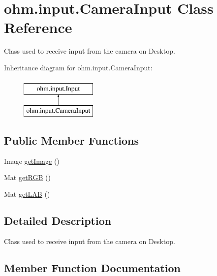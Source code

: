 \hypertarget{classohm_1_1input_1_1_camera_input}{}\section{ohm.\+input.\+Camera\+Input Class Reference}
\label{classohm_1_1input_1_1_camera_input}


Class used to receive input from the camera on Desktop.  


Inheritance diagram for ohm.\+input.\+Camera\+Input\+:\begin{figure}[H]
\begin{center}
\leavevmode
\includegraphics[height=2.000000cm]{classohm_1_1input_1_1_camera_input}
\end{center}
\end{figure}
\subsection*{Public Member Functions}
\begin{DoxyCompactItemize}
\item 
Image \hyperlink{classohm_1_1input_1_1_camera_input_a5d34760a889c9e574f8e3050bde679b6}{get\+Image} ()
\item 
Mat \hyperlink{classohm_1_1input_1_1_camera_input_ad237c282f6c3367ef857d12ebb079b38}{get\+R\+GB} ()
\item 
Mat \hyperlink{classohm_1_1input_1_1_camera_input_a1cee784ad09131e95ded21d07a42c8d4}{get\+L\+AB} ()
\end{DoxyCompactItemize}


\subsection{Detailed Description}
Class used to receive input from the camera on Desktop. 

\subsection{Member Function Documentation}
\hypertarget{classohm_1_1input_1_1_camera_input_a5d34760a889c9e574f8e3050bde679b6}{}\label{classohm_1_1input_1_1_camera_input_a5d34760a889c9e574f8e3050bde679b6} 
